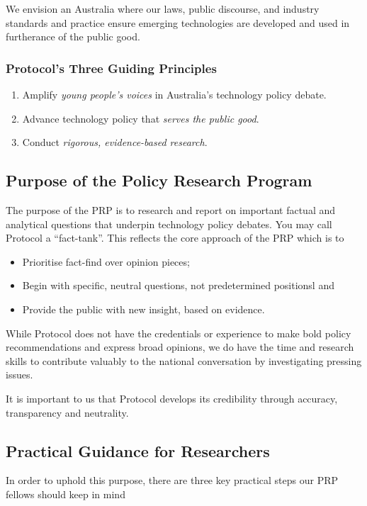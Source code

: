 \documentclass[12pt, a4paper]{article}
\begin{document}
We envision an Australia where our laws, public discourse, and industry standards and practice ensure emerging technologies are developed and used in furtherance of the public good.

\subsubsection{Protocol's Three Guiding Principles}

\begin{enumerate}
	\item Amplify \emph{young people's voices} in Australia's technology policy debate.
	\item Advance technology policy that \emph{serves the public good}.
	\item Conduct \emph{rigorous, evidence-based research}.
\end{enumerate}

\subsection{Purpose of the Policy Research Program}
The purpose of the PRP is to research and report on important factual and analytical questions that underpin technology policy debates.
You may call Protocol a “fact-tank”. This reflects the core approach of the PRP which is to
\begin{itemize}
	\item Prioritise fact-find over opinion pieces;
	\item Begin with specific, neutral questions, not predetermined positionsl and
	\item Provide the public with new insight, based on evidence.
\end{itemize}

While Protocol does not have the credentials or experience to make bold policy recommendations and express broad opinions, we do have the time and research skills to contribute valuably to the national conversation by investigating pressing issues.

It is important to us that Protocol develops its credibility through accuracy, transparency and neutrality.

\subsection{Practical Guidance for Researchers}
In order to uphold this purpose, there are three key practical steps our PRP fellows should keep in mind
\end{document}
